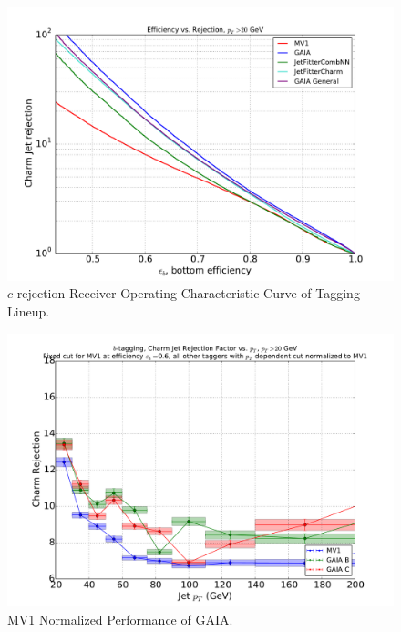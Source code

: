 \begin{figure}[h]
\includegraphics[width=\textwidth]{figures/btag/c_rej_ROC.pdf}
\caption[The ATLAS detector]{$c$-rejection Receiver Operating Characteristic Curve of Tagging Lineup.
\label{fig:crejROC}}
\end{figure}

\begin{figure}[h]
\includegraphics[width=\textwidth]{figures/btag/c_rej_mv1normalized_pTdep_60pct.pdf}
\caption[The ATLAS detector]{MV1 Normalized Performance of GAIA.
\label{fig:crejmv1norm60}}
\end{figure}

